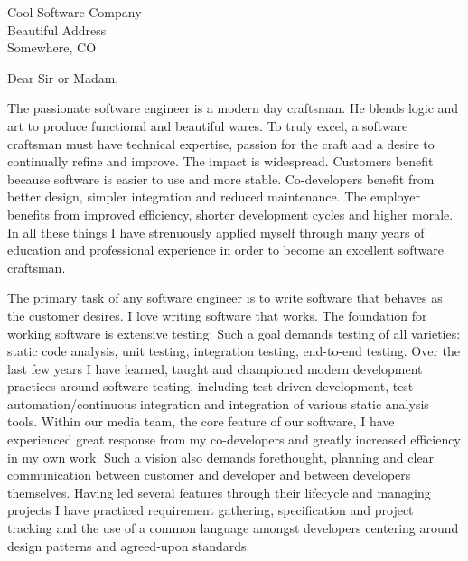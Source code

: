 \documentclass{letter}
\begin{document}
\address{Nathanael Thompson\\1102 Lincolnshire Drive\\Champaign, IL 61821\\nat@alumni.brown.edu\\(469)
230-7125 (Mobile)}
\signature{Nathanael Thompson}
\begin{letter}{Cool Software Company\\Beautiful Address\\Somewhere, CO}

\opening{Dear Sir or Madam,}
The passionate software engineer is a modern day craftsman.  
He blends logic and
art to produce functional and beautiful wares.  
To truly excel, a software craftsman must have technical expertise, passion for
the craft and a desire to continually refine and improve.
The impact is widespread.
Customers benefit because software is easier to use and more stable.
Co-developers benefit from better design, simpler integration and reduced
maintenance.  The employer benefits from improved efficiency, shorter
development cycles and higher morale.
In all these things I have strenuously applied myself through many
years of education and professional experience in order to become an excellent
software craftsman.

The primary task of any software engineer is to write software that behaves as
the customer desires.  I love writing software that works.  The foundation for
working software is extensive testing:
Such a goal demands testing of all varieties:
static code analysis,
unit testing, integration testing, end-to-end testing. 
Over the last few years I have learned, taught and championed modern development
practices around software testing, including test-driven development, test
automation/continuous integration and integration of various static analysis
tools.  
Within our media team, the core feature of our software,
I have experienced great response from my co-developers and greatly
increased efficiency in my own work.
Such a vision also
demands forethought, planning and clear communication between customer and
developer and between developers themselves.
Having led several features through their lifecycle and managing projects I have
practiced requirement gathering, specification and project tracking and the use
of a common language amongst developers centering around design patterns and
agreed-upon standards.


\end{letter}
\end{document}
